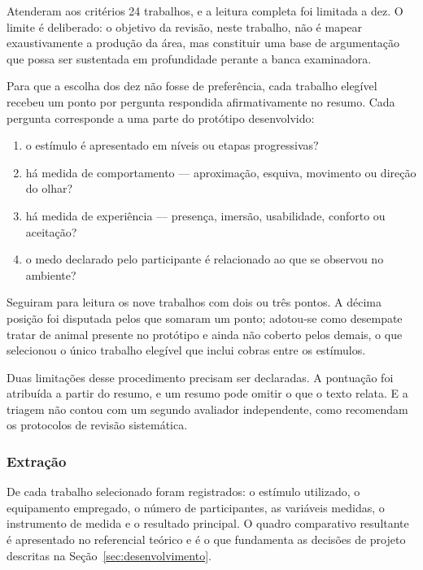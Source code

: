 Atenderam aos critérios 24 trabalhos, e a leitura completa foi limitada a
dez. O limite é deliberado: o objetivo da revisão, neste trabalho, não é
mapear exaustivamente a produção da área, mas constituir uma base de
argumentação que possa ser sustentada em profundidade perante a banca
examinadora.

Para que a escolha dos dez não fosse de preferência, cada trabalho
elegível recebeu um ponto por pergunta respondida afirmativamente no
resumo. Cada pergunta corresponde a uma parte do protótipo desenvolvido:

\begin{enumerate}
  \item o estímulo é apresentado em níveis ou etapas progressivas?
  \item há medida de comportamento --- aproximação, esquiva, movimento ou
  direção do olhar?
  \item há medida de experiência --- presença, imersão, usabilidade,
  conforto ou aceitação?
  \item o medo declarado pelo participante é relacionado ao que se
  observou no ambiente?
\end{enumerate}

Seguiram para leitura os nove trabalhos com dois ou três pontos. A décima
posição foi disputada pelos que somaram um ponto; adotou-se como
desempate tratar de animal presente no protótipo e ainda não coberto
pelos demais, o que selecionou o único trabalho elegível que inclui
cobras entre os estímulos.

Duas limitações desse procedimento precisam ser declaradas. A pontuação
foi atribuída a partir do resumo, e um resumo pode omitir o que o texto
relata. E a triagem não contou com um segundo avaliador independente,
como recomendam os protocolos de revisão sistemática.

\subsubsection{Extração}

De cada trabalho selecionado foram registrados: o estímulo utilizado, o
equipamento empregado, o número de participantes, as variáveis medidas, o
instrumento de medida e o resultado principal. O quadro comparativo
resultante é apresentado no referencial teórico e é o que fundamenta as
decisões de projeto descritas na Seção~\ref{sec:desenvolvimento}.

